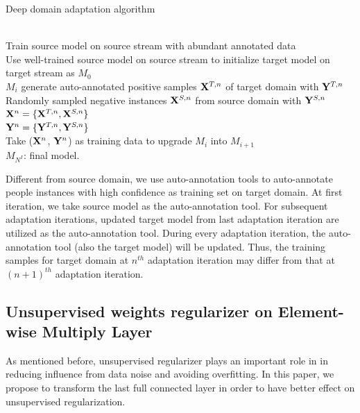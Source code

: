 \documentclass[runningheads]{llncs}
\begin{document}
\begin{algorithm}
\caption{Deep domain adaptation algorithm}
\label{algorithm:Deep domain adaptation algorithm}
\begin{algorithmic}[1]
 {} \\
\indent Train source model on source stream with abundant annotated data \\
\indent Use well-trained source model on source stream to initialize target model on target stream as $M_{0}$
 \\
\indent \indent $M_{i}$ generate auto-annotated positive samples ${\bf X}^{T,n}$ of target domain with ${\bf Y}^{T,n}$\\
\indent \indent Randomly sampled negative instances ${\bf X}^{S,n}$ from source domain with ${\bf Y}^{S,n}$\\
\indent \indent ${\bf X}^{n} = \{{\bf X}^{T,n}, {\bf X}^{S,n}\}$ \\
\indent \indent ${\bf Y}^{n} = \{{\bf Y}^{T,n}, {\bf Y}^{S,n}\}$ \\
\indent \indent Take (${\bf X}^{n}$, ${\bf Y}^{n}$) as training data to upgrade $M_{i}$ into $M_{i+1}$
\EndFor \\
\indent $M_{N^{I}}$: final model.
\EndProcedure
\end{algorithmic}
\end{algorithm}

Different from source domain, we use auto-annotation tools to auto-annotate people instances with high confidence as training set on target domain. At first iteration, we take source model as the auto-annotation tool. For subsequent adaptation iterations, updated target model from last adaptation iteration are utilized as the auto-annotation tool. During every adaptation iteration, the auto-annotation tool (also the target model) will be updated. Thus, the training samples for target domain at $n^{th}$ adaptation iteration may differ from that at $(n+1)^{th}$ adaptation iteration.


\subsection{Unsupervised weights regularizer on Element-wise Multiply Layer}
\label{Section:Unsupervised weights regularizer on Element-wise Multiply Layer}

As mentioned before, unsupervised regularizer plays an important role in in reducing influence from data noise and avoiding overfitting. In this paper, we propose to transform the last full connected layer in order to have better effect on unsupervised regularization.
\end{document}
